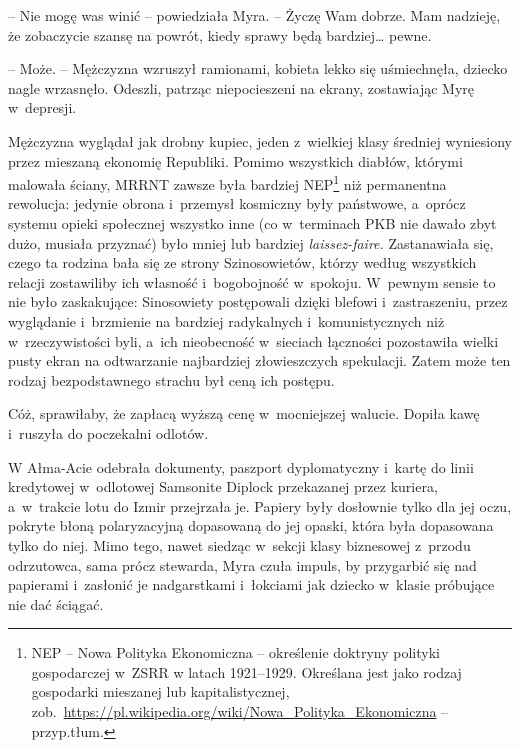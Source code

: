\documentclass[oneside,polish,11pt,sfheadings]{mwbk}
\begin{document}
-- Nie mogę was winić -- powiedziała Myra. -- Życzę Wam dobrze. Mam
nadzieję, że zobaczycie szansę na powrót, kiedy sprawy będą bardziej\ldots
pewne.

-- Może. -- Mężczyzna wzruszył ramionami, kobieta lekko się uśmiechnęła,
dziecko nagle wrzasnęło. Odeszli, patrząc niepocieszeni na ekrany,
zostawiając Myrę w~depresji.

Mężczyzna wyglądał jak drobny kupiec, jeden z~wielkiej klasy średniej
wyniesiony przez mieszaną ekonomię Republiki. Pomimo wszystkich diabłów,
którymi malowała ściany, MRRNT zawsze była bardziej NEP\footnote{ NEP -- Nowa
Polityka Ekonomiczna -- określenie doktryny polityki gospodarczej w~ZSRR
w latach 1921--1929. Określana jest jako rodzaj gospodarki mieszanej lub
kapitalistycznej,
zob.~\url{https://pl.wikipedia.org/wiki/Nowa\_Polityka\_Ekonomiczna}
-- przyp.tłum.} niż permanentna rewolucja: jedynie obrona i~przemysł
kosmiczny były państwowe, a~oprócz systemu opieki społecznej wszystko
inne (co w~terminach PKB nie dawało zbyt dużo, musiała przyznać) było
mniej lub bardziej \textit{laissez-faire.} Zastanawiała się, czego ta
rodzina bała się ze strony Szinosowietów, którzy według wszystkich
relacji zostawiliby ich własność i~bogobojność w~spokoju. W~pewnym
sensie to nie było zaskakujące: Sinosowiety postępowali dzięki blefowi i~zastraszeniu, przez wyglądanie i~brzmienie na bardziej radykalnych i~komunistycznych niż w~rzeczywistości byli, a~ich nieobecność w~sieciach
łączności pozostawiła wielki pusty ekran na odtwarzanie najbardziej
złowieszczych spekulacji. Zatem może ten rodzaj bezpodstawnego strachu
był ceną ich postępu.

Cóż, sprawiłaby, że zapłacą wyższą cenę w~mocniejszej walucie. Dopiła
kawę i~ruszyła do poczekalni odlotów.

W Ałma-Acie odebrała dokumenty, paszport dyplomatyczny i~kartę do linii
kredytowej w~odlotowej Samsonite Diplock przekazanej przez kuriera, a~w~trakcie lotu do Izmir przejrzała je. Papiery były dosłownie tylko dla
jej oczu, pokryte błoną polaryzacyjną dopasowaną do jej opaski, która
była dopasowana tylko do niej. Mimo tego, nawet siedząc w~sekcji klasy
biznesowej z~przodu odrzutowca, sama prócz stewarda, Myra czuła impuls,
by przygarbić się nad papierami i~zasłonić je nadgarstkami i~łokciami
jak dziecko w~klasie próbujące nie dać ściągać.
\end{document}
